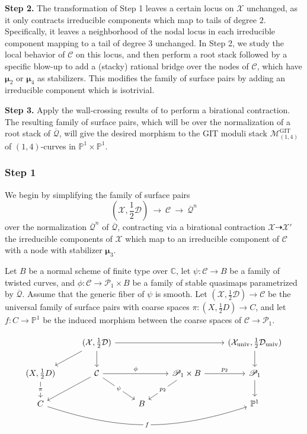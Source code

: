 \documentclass[a4paper,12pt]{amsart}
\newcommand{\cQ}{\mathcal{Q}}
\DeclareMathOperator{\univ}{univ}
\DeclareMathOperator{\GIT}{GIT}
\newcommand{\bC}{{\mathbb C}}
\newcommand{\bP}{{\mathbb P}}
\newcommand{\sP}{{\mathscr{P}}}
\newcommand{\sD}{{\mathscr{D}}}
\newcommand{\sX}{{\mathscr{X}}}
\newcommand{\sC}{{\mathscr{C}}}
\newcommand{\cX}{{\mathcal{X}}}
\newcommand{\bmu}{\bm{\mu}}
\newcommand\cD{{\mathcal{D}}}
\newcommand\cC{{\mathcal{C}}}
\newcommand\cM{{\mathcal{M}}}
\theoremstyle{definition}
\theoremstyle{remark}
\begin{document}
\textbf{Step 2.} The transformation of Step 1 leaves a certain locus on $\sX$ unchanged, as it only contracts irreducible components which map to tails of degree $2$. Specifically, it leaves a neighborhood of the nodal locus in each irreducible component mapping to a tail of degree $3$ unchanged. In Step 2, we study the local behavior of $\sC$ on this locus, and then perform a root stack followed by a specific blow-up to add a (stacky) rational bridge over the nodes of $\sC$, which have $\bmu_2$ or $\bmu_4$ as stabilizers. This modifies the family of surface pairs by adding an irreducible component which is isotrivial.

\textbf{Step 3.} Apply the wall-crossing results of \cite{ascher2023wall,meng2023mmp} to perform a birational contraction. The resulting family of surface pairs, which will be over the normalization of a root stack of $\overline{\cQ}$, will give the desired morphism to the GIT moduli stack $\cM^{\GIT}_{(1,4)}$ of $(1,4)$-curves in $\bP^1\times \bP^1$.

\subsubsection{Step 1}\label{subsub_step_1} We begin by simplifying the family of surface pairs $$\textstyle (\sX,\frac{1}{2}\sD)\ \longrightarrow \ \sC \ \longrightarrow \ \overline{\cQ}^n$$ over the normalization $\overline{\cQ}^n$ of $\overline{\cQ}$, contracting via a birational contraction $\sX \dashrightarrow \sX'$ the irreducible components of $\sX$ which map to an irreducible component of $\sC$ with a node with stabilizer $\bmu_3$. 

Let $B$ be a normal scheme of finite type over $\bC$, let $\psi\colon\cC\rightarrow B$ be a family of twisted curves, and $\phi\colon \cC\to \sP_1\times B$ be a family of stable quasimaps parametrized by $\overline{\cQ}$. Assume that the generic fiber of $\psi$ is smooth. Let $(\cX,\frac{1}{2}\cD)\to \cC$ be the universal family of surface pairs with coarse spaces $\pi\colon (X,\frac{1}{2}D)\to C$, and let $f\colon C\to \bP^1$ be the induced morphism between the coarse spaces of $\cC\rightarrow \sP_1$.


\[\begin{tikzcd}
	& {(\mathcal{X},\frac{1}{2}\mathcal{D})} &&& {(\mathcal{X}_{\univ},\frac{1}{2}\mathcal{D}_{\univ})} \\
	{(X,\frac{1}{2}D)} & {\mathcal{C}} && {\mathscr{P}_1\times B} & {\mathscr{P}_1} \\
	C && B && {\mathbb{P}^1}
	\arrow[from=1-2, to=1-5]
	\arrow[from=1-2, to=2-1]
	\arrow[from=1-2, to=2-2]
	\arrow[from=1-5, to=2-5]
	\arrow["\pi"{description}, from=2-1, to=3-1]
	\arrow["\phi", from=2-2, to=2-4]
	\arrow[from=2-2, to=3-1]
	\arrow["\psi"{description}, from=2-2, to=3-3]
	\arrow["{p_2}", from=2-4, to=2-5]
	\arrow["{p_2}"{description}, from=2-4, to=3-3]
	\arrow[from=2-5, to=3-5]
	\arrow["f"{description}, bend right = 18pt, from=3-1, to=3-5]
\end{tikzcd}\]
\end{document}
